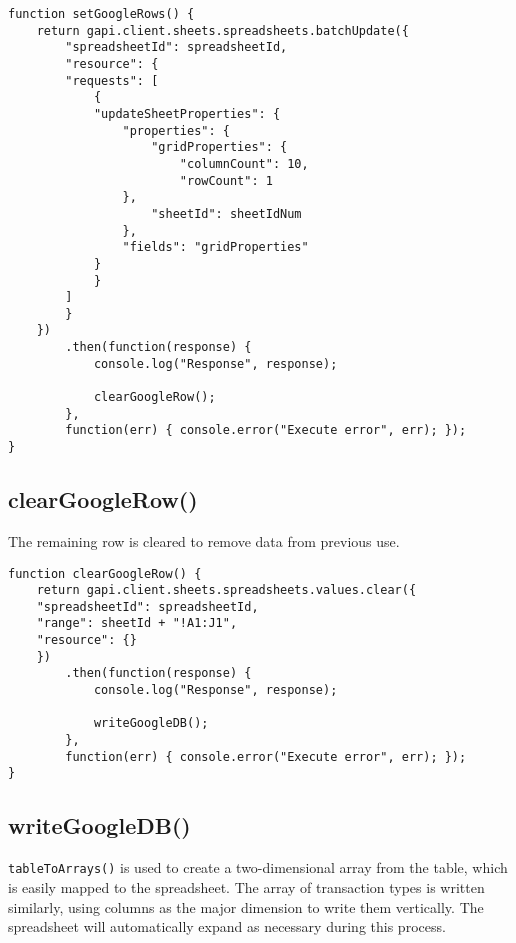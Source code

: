 \documentclass[letterpaper]{article}
\begin{document}
\begin{lstlisting}[firstnumber=152]
function setGoogleRows() {
    return gapi.client.sheets.spreadsheets.batchUpdate({
        "spreadsheetId": spreadsheetId,
        "resource": {
        "requests": [
            {
            "updateSheetProperties": {
                "properties": {
                    "gridProperties": {
                        "columnCount": 10,
                        "rowCount": 1
                },
                    "sheetId": sheetIdNum
                },
                "fields": "gridProperties"
            }
            }
        ]
        }
    })
        .then(function(response) {
            console.log("Response", response);

            clearGoogleRow();
        },
        function(err) { console.error("Execute error", err); });
}
\end{lstlisting}

\subsection{clearGoogleRow()}

The remaining row is cleared to remove data from previous use.

\begin{lstlisting}[firstnumber=180]
function clearGoogleRow() {
    return gapi.client.sheets.spreadsheets.values.clear({
    "spreadsheetId": spreadsheetId,
    "range": sheetId + "!A1:J1",
    "resource": {}
    })
        .then(function(response) {
            console.log("Response", response);

            writeGoogleDB();
        },
        function(err) { console.error("Execute error", err); });
}
\end{lstlisting}

\subsection{writeGoogleDB()}

\lstinline{tableToArrays()} is used to create a two-dimensional array from the table, which is easily mapped to the spreadsheet.
The array of transaction types is written similarly, using columns as the major dimension to write them vertically.
The spreadsheet will automatically expand as necessary during this process.
\end{document}
